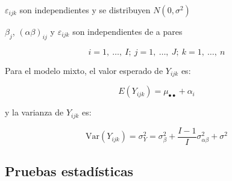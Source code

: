 \documentclass[]{book}
\theoremstyle{definition}
\theoremstyle{definition}
\theoremstyle{definition}
\theoremstyle{remark}
\begin{document}
\(\varepsilon_{ijk}\) son independientes y se distribuyen
\(N\left( 0,\sigma^{2} \right)\)

\(\beta_{j}\), \(\left( \alpha\beta \right)_{ij}\) y
\(\varepsilon_{ijk}\) son independientes de a pares

\[
i = 1,\ \ldots,\ I;\ j = 1,\ \ldots,\ J;\ k = 1,\ \ldots,\ n
\]

Para el modelo mixto, el valor esperado de \(Y_{ijk}\) es:

\[
E(Y_{ijk}) = \mu_{\bullet \bullet} + \alpha_{i}
\]

y la varianza de \(Y_{ijk}\) es:

\[
\text{Var}\left( Y_{ijk} \right) = \sigma_{Y}^{2} = \sigma_{\beta}^{2} + \frac{I - 1}{I}\sigma_{\alpha\beta}^{2} + \sigma^{2}
\]

\hypertarget{pruebas-estadisticas}{%
\subsection{Pruebas estadísticas}\label{pruebas-estadisticas}}
\end{document}
